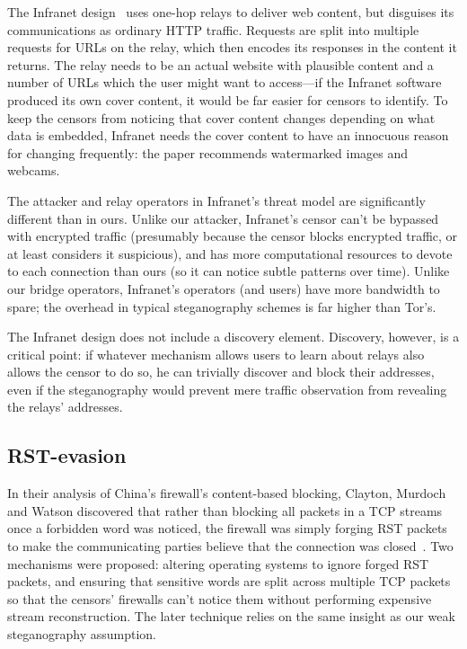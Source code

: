 \documentclass{llncs}
\begin{document}
The Infranet design~\cite{infranet} uses one-hop relays to deliver web
content, but disguises its communications as ordinary HTTP traffic.  Requests
are split into multiple requests for URLs on the relay, which then encodes
its responses in the content it returns.  The relay needs to be an actual
website with plausible content and a number of URLs which the user might want
to access---if the Infranet software produced its own cover content, it would
be far easier for censors to identify.  To keep the censors from noticing
that cover content changes depending on what data is embedded, Infranet needs
the cover content to have an innocuous reason for changing frequently: the
paper recommends watermarked images and webcams.

The attacker and relay operators in Infranet's threat model are significantly
different than in ours.  Unlike our attacker, Infranet's censor can't be
bypassed with encrypted traffic (presumably because the censor blocks
encrypted traffic, or at least considers it suspicious), and has more
computational resources to devote to each connection than ours (so it can
notice subtle patterns over time).  Unlike our bridge operators, Infranet's
operators (and users) have more bandwidth to spare; the overhead in typical
steganography schemes is far higher than Tor's.

The Infranet design does not include a discovery element.  Discovery,
however, is a critical point: if whatever mechanism allows users to learn
about relays also allows the censor to do so, he can trivially discover and
block their addresses, even if the steganography would prevent mere traffic
observation from revealing the relays' addresses.

\subsection{RST-evasion}
In their analysis of China's firewall's content-based blocking, Clayton,
Murdoch and Watson discovered that rather than blocking all packets in a TCP
streams once a forbidden word was noticed, the firewall was simply forging
RST packets to make the communicating parties believe that the connection was
closed~\cite{clayton:pet2006}.  Two mechanisms were proposed: altering
operating systems to ignore forged RST packets, and ensuring that sensitive
words are split across multiple TCP packets so that the censors' firewalls
can't notice them without performing expensive stream reconstruction.  The
later technique relies on the same insight as our weak steganography
assumption.
\end{document}
